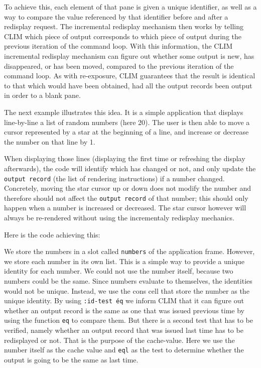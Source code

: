 To achieve this, each element of that pane is given a unique
identifier, as well as a way to compare the value referenced by that
identifier before and after a redisplay request.  The incremental
redisplay mechanism then works by telling CLIM which piece of output
corresponds to which piece of output during the previous iteration of
the command loop. With this information, the CLIM incremental
redisplay mechanism can figure out whether some output is new, has
disappeared, or has been moved, compared to the previous iteration of
the command loop.  As with re-exposure, CLIM guarantees that the
result is identical to that which would have been obtained, had all
the output records been output in order to a blank pane.

The next example illustrates this idea.  It is a simple application
that displays line-by-line a list of random numbers (here 20). The
user is then able to move a cursor represented by a star at the
beginning of a line, and increase or decrease the number on that line
by 1.

When displaying those lines (displaying the first time or refreshing
the display afterwards), the code will identify which has changed or
not, and only update the \texttt{output record} (the list of rendering
instructions) if a number changed. Concretely, moving the star cursor
up or down does not modify the number and therefore should not affect
the \texttt{output record} of that number; this should only happen
when a number is increased or decreased. The star cursor however will
always be re-rendered without using the incrementaly redisplay
mechanics.


Here is the code achieving this:



We store the numbers in a slot called \texttt{numbers} of the
application frame.  However, we store each number in its own list.
This is a simple way to provide a unique identity for each number.  We
could not use the number itself, because two numbers could be the
same. Since numbers evaluate to themselves, the identities would not
be unique.  Instead, we use the cons cell that store the number as the
unique identity.  By using \texttt{:id-test \'eq} we inform CLIM that
it can figure out whether an output record is the same as one that was
issued previous time by using the function \texttt{eq} to compare
them.  But there is a second test that has to be verified, namely
whether an output record that was issued last time has to be
redisplayed or not.  That is the purpose of the cache-value.  Here we
use the number itself as the cache value and \texttt{eql} as the test
to determine whether the output is going to be the same as last time.

